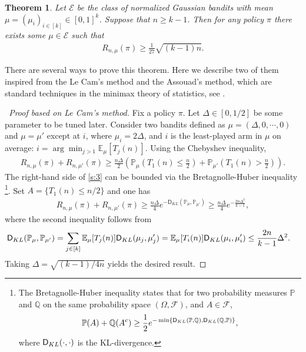 \documentclass[letterpaper,11pt,openright,openany]{book}
\numberwithin{equation}{section}
\theoremstyle{plain}
\newtheorem{Th}{Theorem}[section]
\theoremstyle{definition}
\def\Q{{\mathbb Q}}
\def\E{{\mathbb E}}
\def\P{{\mathbb P}}
\def\V{{\mathcal E}}
\begin{document}
\begin{Th}\label{s:minimax}
Let $\V$ be the class of normalized Gaussian bandits with mean $\mu=(\mu_i)_{i\in [k]}\in [0,1]^k$. Suppose that $n\geq k-1$. Then for any policy $\pi$ there exists some $\mu\in\V$ such that
\begin{align}
R_{n,\mu}(\pi)\geq\frac{1}{27}\sqrt{(k-1)n}. \label{s:6}
\end{align}  
\end{Th}

There are several ways to prove this theorem. Here we describe two of them inspired from the Le Cam's method and the Assouad's method, which are standard techniques in the minimax theory of statistics, see \cite{Yu_1997}. 


\begin{proof}[~Proof based on Le Cam's method]
Fix a policy $\pi$. Let $\Delta\in [0, 1/2]$ be some parameter to be tuned later. Consider two bandits defined as
$\mu = (\Delta, 0, \cdots, 0)$ and $\mu = \mu'$ except at $i$, where $\mu_i = 2\Delta$, and $i$ is the least-played arm in $\mu$ on average: $i=\arg\min_{j>1}\E_\mu[T_j(n)]$. Using the Chebyshev inequality,
\begin{align}
R_{n, \mu}(\pi)+R_{n, \mu'}(\pi)\geq \frac{n\Delta}{2}\left(\P_\mu\left(T_1(n)\leq \frac{n}{2}\right)+\P_{\mu'}\left(T_1(n)> \frac{n}{2}\right)\right).\label{s:3}
\end{align}
The right-hand side of \eqref{s:3} can be bounded via the Bretagnolle-Huber inequality \footnote{The Bretagnolle-Huber inequality states that for two probability measures $\P$ and $\Q$ on the same probability space $(\Omega, \mathcal{F})$, and $A\in\mathcal{F}$, 
\begin{align}
\P(A)+\Q(A^c)\geq\frac{1}{2}e^{-\min\{\textsf D_{KL}(\P, \Q), \textsf D_{KL}(\Q, \P)\}},\label{s:4}
\end{align}
where $\textsf D_{KL}(\cdot, \cdot)$ is the KL-divergence.}. 
Set $A = \{T_1(n)\leq n/2\}$ and one has 
\begin{align*}
R_{n, \mu}(\pi)+R_{n, \mu'}(\pi)\geq\frac{n\Delta}{4}e^{-\mathsf D_{KL}(\P_\mu, \P_{\mu'})}\geq\frac{n\Delta}{4}e^{-\frac{2n\Delta^2}{k-1}},
\end{align*}
where the second inequality follows from 
\begin{align}
\textsf D_{KL}(\P_\mu, \P_{\mu'})& = \sum_{j\in [k]}\E_\mu[T_j(n)]\textsf D_{KL}(\mu_j, \mu'_j)\label{s:5}= \E_\mu[T_i(n)]\textsf D_{KL}(\mu_i, \mu'_i)\leq\frac{2n}{k-1}\Delta^2.
\end{align}
Taking $\Delta = \sqrt{(k-1)/4n}$ yields the desired result. 
\end{proof}
\end{document}
